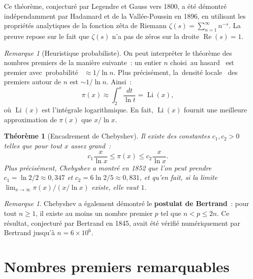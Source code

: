 \documentclass[12pt,a4paper,openany]{book}
\theoremstyle{definition}
\theoremstyle{plain}
\newtheorem{theoreme}[definition]{Théorème}
\theoremstyle{remark}
\newtheorem{remarque}[definition]{Remarque}
\providecommand{\og}{\guillemotleft\,}
\providecommand{\fg}{\,\guillemotright}
\begin{document}
Ce théorème, conjecturé par Legendre et
Gauss vers 1800, a été démontré indépendamment par
Hadamard et de la
Vallée-Poussin en 1896, en utilisant les
propriétés analytiques de la fonction zêta de Riemann $\zeta(s) = \sum_{n=1}^{\infty}
n^{-s}$. La preuve repose sur le fait que $\zeta(s)$
n'a pas de zéros sur la droite $\operatorname{Re}(s) = 1$.

\begin{remarque}[Heuristique probabiliste]
\label{rem:pnt:heuristique}
On peut interpréter le théorème des nombres premiers de la manière suivante~: un
entier $n$ choisi \og au hasard \fg{} est premier avec \og probabilité \fg{}
$\approx 1/\ln n$. Plus précisément, la \og densité locale \fg{} des premiers
autour de $n$ est $\sim 1/\ln n$. Ainsi~:
\[
  \pi(x) \approx \int_2^x \frac{dt}{\ln t} = \operatorname{Li}(x),
\]
où $\operatorname{Li}(x)$ est l'intégrale
logarithmique. En fait, $\operatorname{Li}(x)$ fournit une meilleure approximation de
$\pi(x)$ que $x/\ln x$.
\end{remarque}

\begin{theoreme}[Encadrement de Chebyshev]
\label{thm:chebyshev}
Il existe des constantes $c_1, c_2 > 0$ telles que pour tout $x$ assez grand~:
\[
  c_1 \frac{x}{\ln x} \leq \pi(x) \leq c_2 \frac{x}{\ln x}.
\]
Plus précisément, Chebyshev a montré en 1852 que l'on peut prendre $c_1 = \ln 2 / 2
\approx 0{,}347$ et $c_2 = 6 \ln 2 / 5 \approx 0{,}831$, et qu'en fait, si la
limite $\lim_{x \to \infty} \pi(x) / (x/\ln x)$ existe, elle vaut $1$.
\end{theoreme}

\begin{remarque}
\label{rem:chebyshev:postulat}
Chebyshev a également démontré le \textbf{postulat de Bertrand}~: pour tout $n \geq 1$, il existe au moins un nombre premier $p$ tel que
$n < p \leq 2n$. Ce résultat, conjecturé par Bertrand en 1845, avait été vérifié
numériquement par Bertrand jusqu'à $n = 6 \times 10^6$.
\end{remarque}

\section{Nombres premiers remarquables}
\label{sec:ch2:speciaux}
\end{document}
